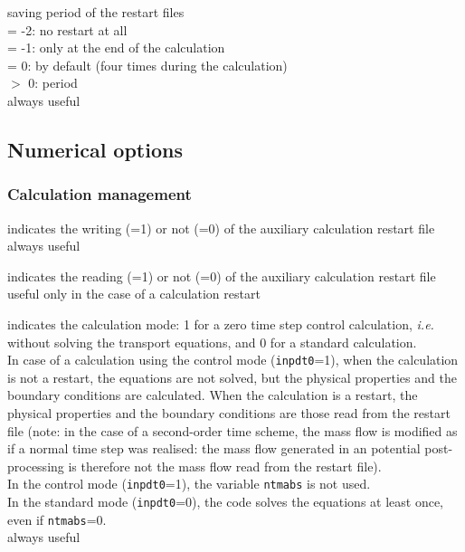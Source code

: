 {saving period of the restart files\\
\hspace*{1.3cm}= -2: no restart at all\\
\hspace*{1.3cm}= -1: only at the end of the calculation\\
\hspace*{1.3cm}= 0: by default (four times during the calculation)\\
\hspace*{1.3cm}$>$ 0: period\\
always useful}


\subsection{Numerical options}
\subsubsection{Calculation management}

{indicates the writing (=1) or not (=0) of the auxiliary calculation
restart file\\
always useful}

{indicates the reading (=1) or not (=0) of the auxiliary
calculation restart file\\
useful only in the case of a calculation restart}

{indicates the calculation mode: 1 for a zero time step control
calculation, {\em i.e.} without solving the transport equations,
and 0 for a standard calculation.\\
In case of a calculation using the control mode ({\tt inpdt0}=1), when the
calculation is not a restart, the equations are not solved, but the
physical properties and the boundary conditions are calculated. When
the calculation is a restart, the physical properties and the boundary
conditions are those read from the restart file (note: in the case of a
second-order time scheme, the mass flow is modified as if a normal
time step was realised: the mass flow generated in an potential
post-processing is therefore not the mass flow read from the restart file).\\
In the control mode ({\tt inpdt0}=1), the variable {\tt ntmabs} is not used.\\
In the standard mode ({\tt inpdt0}=0), the code solves the equations at least
once, even if {\tt ntmabs}=0.\\
always useful}

